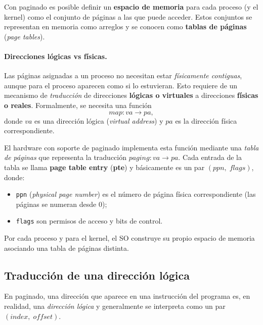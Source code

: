 \documentclass[11pt,a4paper]{article}
\begin{document}
Con paginado es posible definir un \textbf{espacio de memoria} para cada
proceso (y el kernel) como el conjunto de páginas a las que puede
acceder. Estos conjuntos se representan en memoria como arreglos y se
conocen como \textbf{tablas de páginas} (\emph{page tables}).

\paragraph{Direcciones lógicas vs físicas.}
Las páginas asignadas a un proceso no necesitan estar
\emph{físicamente contiguas}, aunque para el proceso aparecen como si lo
estuvieran. Esto requiere de un mecanismo de \emph{traducción} de
direcciones \textbf{lógicas o virtuales} a direcciones
\textbf{físicas o reales}. Formalmente, se necesita una función
\[
\textit{map} : \textit{va} \to \textit{pa},
\]
donde $\textit{va}$ es una dirección lógica (\emph{virtual address}) y
$\textit{pa}$ es la dirección física correspondiente.

El hardware con soporte de paginado implementa esta función mediante una
\emph{tabla de páginas} que representa la traducción
$\textit{paging}: \textit{va} \to \textit{pa}$. Cada entrada de la
tabla se llama \textbf{page table entry} (\textbf{pte}) y básicamente
es un par
$(\textit{ppn},\;\textit{flags})$,
donde:

\begin{itemize}[leftmargin=*,nosep]
    \item \texttt{ppn} (\emph{physical page number}) es el número de
        página física correspondiente (las páginas se numeran desde 0);
    \item \texttt{flags} son permisos de acceso y bits de control.
\end{itemize}

Por cada proceso y para el kernel, el SO construye su propio espacio de
memoria asociando una tabla de páginas distinta.

\subsection{Traducción de una dirección lógica}

\begin{importante}
En paginado, una dirección que aparece en una instrucción del programa
es, en realidad, una \emph{dirección lógica} y generalmente se
interpreta como un par
$(\textit{index},\;\textit{offset})$.
\end{importante}
\end{document}
